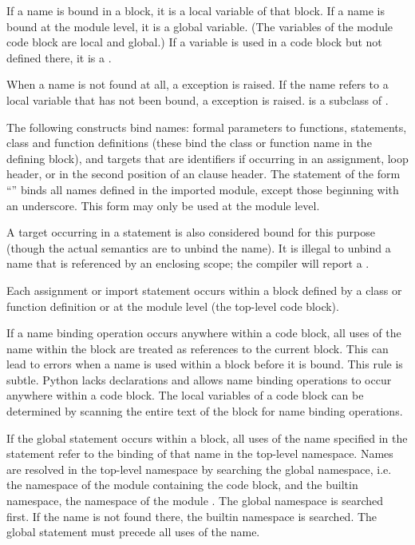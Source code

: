If a name is bound in a block, it is a local variable of that block.
If a name is bound at the module level, it is a global variable.  (The
variables of the module code block are local and global.)  If a
variable is used in a code block but not defined there, it is a
.

When a name is not found at all, a
 exception is raised.  If the name
refers to a local variable that has not been bound, a
 exception is
raised.   is a subclass of
.

The following constructs bind names: formal parameters to functions,
 statements, class and function definitions (these
bind the class or function name in the defining block), and targets
that are identifiers if occurring in an assignment,  loop
header, or in the second position of an  clause
header.  The  statement of the form ``'' binds all names defined in the
imported module, except those beginning with an underscore.  This form
may only be used at the module level.

A target occurring in a  statement is also considered bound
for this purpose (though the actual semantics are to unbind the
name).  It is illegal to unbind a name that is referenced by an
enclosing scope; the compiler will report a .

Each assignment or import statement occurs within a block defined by a
class or function definition or at the module level (the top-level
code block).

If a name binding operation occurs anywhere within a code block, all
uses of the name within the block are treated as references to the
current block.  This can lead to errors when a name is used within a
block before it is bound.
This rule is subtle.  Python lacks declarations and allows
name binding operations to occur anywhere within a code block.  The
local variables of a code block can be determined by scanning the
entire text of the block for name binding operations.

If the global statement occurs within a block, all uses of the name
specified in the statement refer to the binding of that name in the
top-level namespace.  Names are resolved in the top-level namespace by
searching the global namespace, i.e. the namespace of the module
containing the code block, and the builtin namespace, the namespace of
the module .  The global namespace is searched
first.  If the name is not found there, the builtin namespace is
searched.  The global statement must precede all uses of the name.

